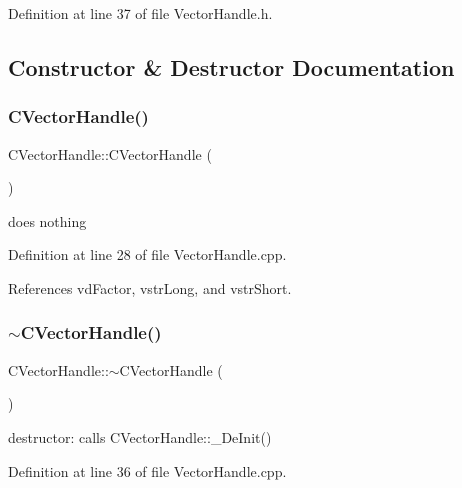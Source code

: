 Definition at line 37 of file Vector\+Handle.\+h.



\subsection{Constructor \& Destructor Documentation}
\mbox{\label{classCVectorHandle_ac6b74f660515541066f809b1339b2fdd}} 
\subsubsection{\texorpdfstring{C\+Vector\+Handle()}{CVectorHandle()}}
{\footnotesize\ttfamily C\+Vector\+Handle\+::\+C\+Vector\+Handle (\begin{DoxyParamCaption}{ }\end{DoxyParamCaption})}



does nothing 



Definition at line 28 of file Vector\+Handle.\+cpp.



References vd\+Factor, vstr\+Long, and vstr\+Short.

\mbox{\label{classCVectorHandle_a74e5aee7e24867695dafa409ab39a379}} 
\subsubsection{\texorpdfstring{$\sim$\+C\+Vector\+Handle()}{~CVectorHandle()}}
{\footnotesize\ttfamily C\+Vector\+Handle\+::$\sim$\+C\+Vector\+Handle (\begin{DoxyParamCaption}{ }\end{DoxyParamCaption})}



destructor\+: calls C\+Vector\+Handle\+::\+\_\+\+De\+Init() 



Definition at line 36 of file Vector\+Handle.\+cpp.



